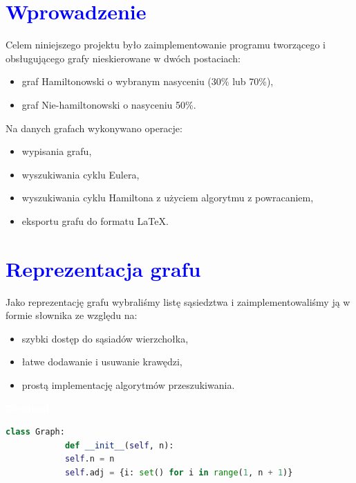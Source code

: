 \documentclass{article}
\begin{document}
	
	
	\newpage
	\titleformat{\section}{\Huge\bfseries}{\thesection}{2em}{}
	\section*{\textcolor{blue}{Wprowadzenie}}
	Celem niniejszego projektu było zaimplementowanie programu tworzącego i obsługującego grafy nieskierowane w dwóch postaciach:
	\begin{itemize}
		\item graf Hamiltonowski o wybranym nasyceniu (30\% lub 70\%),
		\item graf Nie-hamiltonowski o nasyceniu 50\%.
	\end{itemize}
	Na danych grafach wykonywano operacje:
	\begin{itemize}
		\item wypisania grafu,
		\item wyszukiwania cyklu Eulera,
		\item wyszukiwania cyklu Hamiltona z użyciem algorytmu z powracaniem,
		\item eksportu grafu do formatu LaTeX.
	\end{itemize}
	
	\section*{\textcolor{blue}{Reprezentacja grafu}}
	Jako reprezentację grafu wybraliśmy listę sąsiedztwa i zaimplementowaliśmy ją w formie słownika ze względu na:
	\begin{itemize}
		\item szybki dostęp do sąsiadów wierzchołka,
		\item łatwe dodawanie i usuwanie krawędzi,
		\item prostą implementację algorytmów przeszukiwania.
	\end{itemize}
	\begin{tcolorbox}[colback=black,colframe=gray!50!,arc=3mm,boxrule=0pt,left=0pt,right=0pt,width=\linewidth]
		\textcolor{white}{\textbf{\textsf{Terminal}}}\\
		
		\begin{lstlisting}[language=Python]
			class Graph:
			def __init__(self, n):
			self.n = n
			self.adj = {i: set() for i in range(1, n + 1)}
		\end{lstlisting}
		
	\end{tcolorbox}
	
\end{document}
